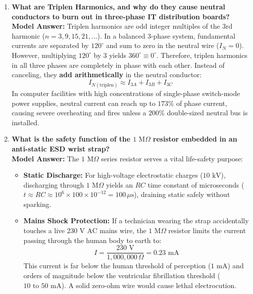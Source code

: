 \begin{enumerate}[leftmargin=*,label=\textbf{Q\arabic*.}]
    \item \textbf{What are Triplen Harmonics, and why do they cause neutral conductors to burn out in three-phase IT distribution boards?} \\
    \textbf{Model Answer:} Triplen harmonics are odd integer multiples of the 3rd harmonic ($n = 3, 9, 15, 21, \dots$). In a balanced 3-phase system, fundamental currents are separated by $120^\circ$ and sum to zero in the neutral wire ($I_N = 0$). However, multiplying $120^\circ$ by 3 yields $360^\circ \equiv 0^\circ$. Therefore, triplen harmonics in all three phases are completely in phase with each other. Instead of canceling, they \textbf{add arithmetically} in the neutral conductor:
    \[
    I_{N(\text{triplen})} \approx I_{3A} + I_{3B} + I_{3C}
    \]
    In computer facilities with high concentrations of single-phase switch-mode power supplies, neutral current can reach up to $173\%$ of phase current, causing severe overheating and fires unless a $200\%$ double-sized neutral bus is installed.

    \item \textbf{What is the safety function of the $1\text{ M}\Omega$ resistor embedded in an anti-static ESD wrist strap?} \\
    \textbf{Model Answer:} The $1\text{ M}\Omega$ series resistor serves a vital life-safety purpose:
    \begin{itemize}
        \item \textbf{Static Discharge:} For high-voltage electrostatic charges ($10\text{ kV}$), discharging through $1\text{ M}\Omega$ yields an $RC$ time constant of microseconds ($t \approx RC \approx 10^6 \times 100 \times 10^{-12} = 100\,\mu\text{s}$), draining static safely without sparking.
        \item \textbf{Mains Shock Protection:} If a technician wearing the strap accidentally touches a live $230\text{ V AC}$ mains wire, the $1\text{ M}\Omega$ resistor limits the current passing through the human body to earth to:
        \[
        I = \frac{230\text{ V}}{1,000,000\,\Omega} = 0.23\text{ mA}
        \]
        This current is far below the human threshold of perception ($1\text{ mA}$) and orders of magnitude below the ventricular fibrillation threshold ($10\text{ to }50\text{ mA}$). A solid zero-ohm wire would cause lethal electrocution.
    \end{itemize}


\end{enumerate}
